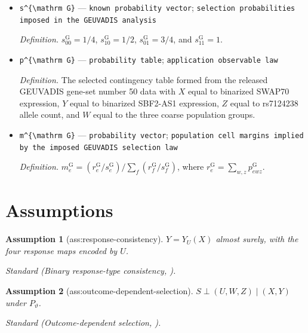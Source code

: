 \documentclass{article}
\newtheorem{assumption}{Assumption}
\begin{document}
\begin{itemize}
  \item \texttt{s\textasciicircum{}\{\textbackslash{}\allowbreak{}mathrm G\}\allowbreak{}} --- \texttt{known probability vector}; \texttt{selection probabilities imposed in the GEUVADIS analysis}
  \par\smallskip\noindent\emph{Definition.} \(s^{\mathrm G}_{00}=1/4\), \(s^{\mathrm G}_{10}=1/2\), \(s^{\mathrm G}_{01}=3/4\), and \(s^{\mathrm G}_{11}=1\).
  \item \texttt{p\textasciicircum{}\{\textbackslash{}\allowbreak{}mathrm G\}\allowbreak{}} --- \texttt{probability table}; \texttt{application observable law}
  \par\smallskip\noindent\emph{Definition.} The selected contingency table formed from the released GEUVADIS gene-set number 50 data with \(X\) equal to binarized SWAP70 expression, \(Y\) equal to binarized SBF2-AS1 expression, \(Z\) equal to rs7124238 allele count, and \(W\) equal to the three coarse population groups.
  \item \texttt{m\textasciicircum{}\{\textbackslash{}\allowbreak{}mathrm G\}\allowbreak{}} --- \texttt{probability vector}; \texttt{population cell margins implied by the imposed GEUVADIS selection law}
  \par\smallskip\noindent\emph{Definition.} \(m^{\mathrm G}_e=(r^{\mathrm G}_e/s^{\mathrm G}_e)/\sum_f(r^{\mathrm G}_f/s^{\mathrm G}_f)\), where \(r^{\mathrm G}_e=\sum_{w,z}p^{\mathrm G}_{ewz}\).
\end{itemize}

\section{Assumptions}

\begin{assumption}[ass:response-consistency]\label{ass:response-consistency}
\(Y=Y_U(X)\) almost surely, with the four response maps encoded by \(U\).
\par\smallskip\noindent\emph{Standard} (Binary response-type consistency, \cite{TianPearl2000}).
\end{assumption}

\begin{assumption}[ass:outcome-dependent-selection]\label{ass:outcome-dependent-selection}
\(S\perp(U,W,Z)\mid(X,Y)\) under \(P_{\vartheta}\).
\par\smallskip\noindent\emph{Standard} (Outcome-dependent selection, \cite{ShingakiYoshidaKuroki2026}).
\end{assumption}
\end{document}
